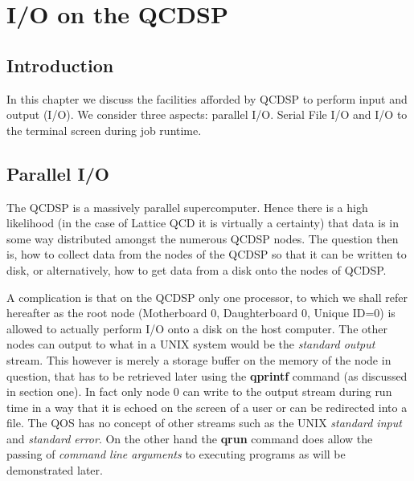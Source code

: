 \chapter{I/O on the QCDSP}
\section{Introduction}
In this chapter we discuss the facilities afforded by QCDSP to perform
input and output (I/O). We consider three aspects: parallel I/O. 
Serial File I/O and I/O to the terminal screen during job runtime.

\section{Parallel I/O}
The QCDSP is a massively parallel supercomputer. Hence there is a high
likelihood (in the case of Lattice QCD it is virtually a certainty) that data
is in some way distributed amongst the numerous QCDSP nodes. The question
then is, how to collect data from the nodes of the QCDSP so that it 
can be written to disk, or alternatively, how to get data from a disk
onto the nodes of QCDSP.

A complication is that on the QCDSP only one processor, to which we
shall refer hereafter as the root node (Motherboard 0, Daughterboard 0,
Unique ID=0) is allowed to actually perform I/O onto a disk on the
host computer. The other nodes can output to what in a UNIX system
would be the {\em standard output} stream. This however is merely a
storage buffer on the memory of the node in question, that has to be
retrieved later using the {\bf qprintf} command (as discussed in
section one).  In fact only node 0 can write to the output stream
during run time in a way that it is echoed on the screen of a user or
can be redirected into a file.  The QOS has no concept of other
streams such as the UNIX {\em standard input} and {\em standard
error}. On the other hand the {\bf qrun} command does allow the
passing of {\em command line arguments} to executing programs as will
be demonstrated later.

